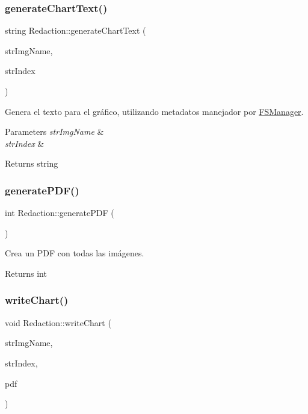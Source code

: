 \subsubsection{\texorpdfstring{generate\+Chart\+Text()}{generateChartText()}}
{\footnotesize\ttfamily string Redaction\+::generate\+Chart\+Text (\begin{DoxyParamCaption}\item[{string}]{str\+Img\+Name,  }\item[{string}]{str\+Index }\end{DoxyParamCaption})\hspace{0.3cm}{\ttfamily [inline]}}



Genera el texto para el gráfico, utilizando metadatos manejador por \mbox{\hyperlink{classFSManager}{F\+S\+Manager}}. 


\begin{DoxyParams}{Parameters}
{\em str\+Img\+Name} & \\
\hline
{\em str\+Index} & \\
\hline
\end{DoxyParams}
\begin{DoxyReturn}{Returns}
string 
\end{DoxyReturn}
\mbox{\label{classRedaction_a4659115b2df63c9e0694c7f7cf325ff6}} 
\subsubsection{\texorpdfstring{generate\+P\+D\+F()}{generatePDF()}}
{\footnotesize\ttfamily int Redaction\+::generate\+P\+DF (\begin{DoxyParamCaption}{ }\end{DoxyParamCaption})\hspace{0.3cm}{\ttfamily [inline]}}



Crea un P\+DF con todas las imágenes. 

\begin{DoxyReturn}{Returns}
int 
\end{DoxyReturn}
\mbox{\label{classRedaction_af897cc53c7d60685232fe19dd76d0d9f}} 
\subsubsection{\texorpdfstring{write\+Chart()}{writeChart()}}
{\footnotesize\ttfamily void Redaction\+::write\+Chart (\begin{DoxyParamCaption}\item[{string}]{str\+Img\+Name,  }\item[{string}]{str\+Index,  }\item[{H\+P\+D\+F\+\_\+\+Doc}]{pdf }\end{DoxyParamCaption})\hspace{0.3cm}{\ttfamily [inline]}}



